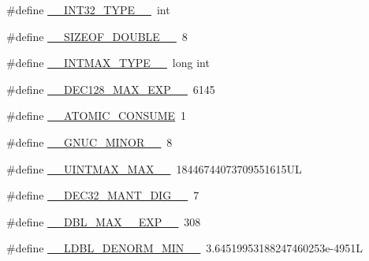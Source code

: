 \begin{DoxyCompactItemize}
\item 
\#define \hyperlink{build-analizer__host-_desktop___qt__5__9__0___g_c_c__64bit-debug_2moc__predefs_8h_a72f76585ea7d1131d4e9be0110fb0ec3}{\+\_\+\+\_\+\+I\+N\+T32\+\_\+\+T\+Y\+P\+E\+\_\+\+\_\+}~int
\item 
\#define \hyperlink{build-analizer__host-_desktop___qt__5__9__0___g_c_c__64bit-debug_2moc__predefs_8h_a6a0b73b50b59fa18dbcea5b6dee0899f}{\+\_\+\+\_\+\+S\+I\+Z\+E\+O\+F\+\_\+\+D\+O\+U\+B\+L\+E\+\_\+\+\_\+}~8
\item 
\#define \hyperlink{build-analizer__host-_desktop___qt__5__9__0___g_c_c__64bit-debug_2moc__predefs_8h_ad3062ff83239e8dd2b8969a2f368d608}{\+\_\+\+\_\+\+I\+N\+T\+M\+A\+X\+\_\+\+T\+Y\+P\+E\+\_\+\+\_\+}~long int
\item 
\#define \hyperlink{build-analizer__host-_desktop___qt__5__9__0___g_c_c__64bit-debug_2moc__predefs_8h_aab1edcef0b79684e5d2f12a2696e260f}{\+\_\+\+\_\+\+D\+E\+C128\+\_\+\+M\+A\+X\+\_\+\+E\+X\+P\+\_\+\+\_\+}~6145
\item 
\#define \hyperlink{build-analizer__host-_desktop___qt__5__9__0___g_c_c__64bit-debug_2moc__predefs_8h_a762c3361bcfeccc1f2742cc94b1ab65b}{\+\_\+\+\_\+\+A\+T\+O\+M\+I\+C\+\_\+\+C\+O\+N\+S\+U\+M\+E}~1
\item 
\#define \hyperlink{build-analizer__host-_desktop___qt__5__9__0___g_c_c__64bit-debug_2moc__predefs_8h_a0b8ad52bece225cdae9c1b46c91c62a5}{\+\_\+\+\_\+\+G\+N\+U\+C\+\_\+\+M\+I\+N\+O\+R\+\_\+\+\_\+}~8
\item 
\#define \hyperlink{build-analizer__host-_desktop___qt__5__9__0___g_c_c__64bit-debug_2moc__predefs_8h_a36b3a5bf25feeef4fbdca37900522f3c}{\+\_\+\+\_\+\+U\+I\+N\+T\+M\+A\+X\+\_\+\+M\+A\+X\+\_\+\+\_\+}~18446744073709551615\+U\+L
\item 
\#define \hyperlink{build-analizer__host-_desktop___qt__5__9__0___g_c_c__64bit-debug_2moc__predefs_8h_a144dfa169f604d99b46658c15338338e}{\+\_\+\+\_\+\+D\+E\+C32\+\_\+\+M\+A\+N\+T\+\_\+\+D\+I\+G\+\_\+\+\_\+}~7
\item 
\#define \hyperlink{build-analizer__host-_desktop___qt__5__9__0___g_c_c__64bit-debug_2moc__predefs_8h_a280f0a9058cc03c2dac890a19881b1fb}{\+\_\+\+\_\+\+D\+B\+L\+\_\+\+M\+A\+X\+\_\+\_\+\+E\+X\+P\+\_\+\+\_\+}~308
\item 
\#define \hyperlink{build-analizer__host-_desktop___qt__5__9__0___g_c_c__64bit-debug_2moc__predefs_8h_a5436993e3c0ddb7caee4b9b01021cde4}{\+\_\+\+\_\+\+L\+D\+B\+L\+\_\+\+D\+E\+N\+O\+R\+M\+\_\+\+M\+I\+N\+\_\+\+\_\+}~3.\+64519953188247460253e-\/4951\+L
\item 

\end{DoxyCompactItemize}
